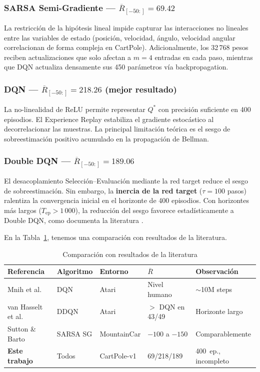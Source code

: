 \subsubsection{SARSA Semi-Gradiente — $\overline{R}_{[-50:]} = 69.42$}

La restricción de la hipótesis lineal impide capturar las interacciones no lineales entre las variables de estado (posición, velocidad, ángulo, velocidad angular correlacionan de forma compleja en CartPole). Adicionalmente, los 32\,768 pesos reciben actualizaciones que solo afectan a $m = 4$ entradas en cada paso, mientras que DQN actualiza densamente sus 450 parámetros vía backpropagation.

\subsubsection{DQN — $\overline{R}_{[-50:]} = 218.26$ (mejor resultado)}

La no-linealidad de ReLU permite representar $Q^*$ con precisión suficiente en 400 episodios. El Experience Replay estabiliza el gradiente estocástico al decorrelacionar las muestras. La principal limitación teórica es el sesgo de sobreestimación positivo acumulado en la propagación de Bellman.

\subsubsection{Double DQN — $\overline{R}_{[-50:]} = 189.06$}

El desacoplamiento Selección--Evaluación mediante la red target reduce el sesgo de sobreestimación. Sin embargo, la \textbf{inercia de la red target} ($\tau = 100$ pasos) ralentiza la convergencia inicial en el horizonte de 400 episodios. Con horizontes más largos ($T_\text{ep} > 1\,000$), la reducción del sesgo favorece estadísticamente a Double DQN, como documenta la literatura \cite{vanHasselt2016}.

En la Tabla~\ref{tab:literatura}, tenemos una comparación con resultados de la literatura.

\begin{table}[htb!]
\caption{Comparación con resultados de la literatura}\label{tab:literatura}
\centering\small
\begin{tabular}{@{}lllll@{}}
\toprule
\textbf{Referencia} & \textbf{Algoritmo} & \textbf{Entorno} & $\overline{R}$ & \textbf{Observación} \\
\midrule
Mnih et al.~\cite{Mnih2015} & DQN & Atari & Nivel humano & $\sim$10M steps \\
van Hasselt et al.~\cite{vanHasselt2016} & DDQN & Atari & $>$ DQN en 43/49 & Horizonte largo \\
Sutton \& Barto \cite{Sutton2018} & SARSA SG & MountainCar & $-100$ a $-150$ & Comparablemente \\
\textbf{Este trabajo} & Todos & CartPole-v1 & 69/218/189 & 400~ep., incompleto \\
\bottomrule
\end{tabular}
\end{table}

